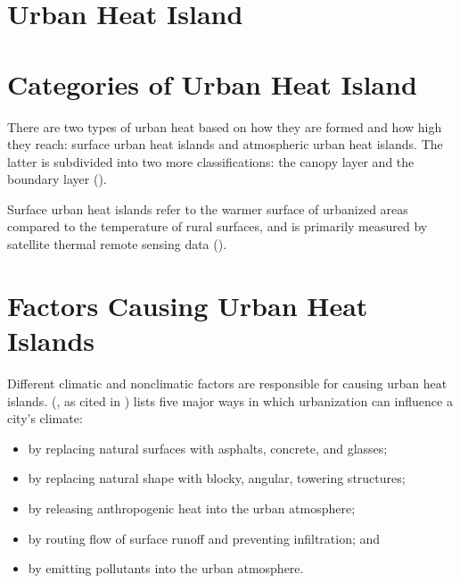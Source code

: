 \section{Urban Heat Island}

	\section{Categories of Urban Heat Island}
	
	There are two types of urban heat based on how they are formed and how high they reach:
	surface urban heat islands and atmospheric urban heat islands.
	The latter is subdivided into two more classifications:
	the canopy layer and the boundary layer (\cite{Zhou2018}).
	
	Surface urban heat islands refer to the warmer surface of urbanized areas compared to the temperature of rural surfaces, and is primarily measured by satellite thermal remote sensing data (\cite{Zhou2018}).
	
	\section{Factors Causing Urban Heat Islands}
	
	Different climatic and nonclimatic factors are responsible for causing urban heat islands.
	\citeauthor{Bridgman1995} (\citeyear{Bridgman1995}, as cited in \cite{Khan2021}) lists five major ways in which urbanization can influence a city's climate:
	\begin{itemize}
		\item by replacing natural surfaces with asphalts, concrete, and glasses;
		\item by replacing natural shape with blocky, angular, towering structures;
		\item by releasing anthropogenic heat into the urban atmosphere;
		\item by routing flow of surface runoff and preventing infiltration; and
		\item by emitting pollutants into the urban atmosphere.
	\end{itemize}